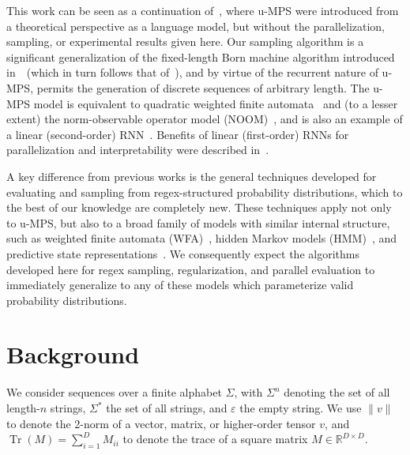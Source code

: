 \documentclass[twoside]{article}
\DeclareMathOperator{\Tr}{Tr}
\newcommand{\R}{\mathbb{R}}
\newcommand{\field}[1]{\R^{#1}}
\begin{document}
This work can be seen as a continuation of~\citep{pestun2017a}, where u-MPS were introduced from a theoretical perspective as a language model, but without the parallelization, sampling, or experimental results given here. Our sampling algorithm is a significant generalization of the fixed-length Born machine algorithm introduced in~\citep{han2018}~(which in turn follows that of~\citep{ferris2012}), and by virtue of the recurrent nature of u-MPS, permits the generation of discrete sequences of arbitrary length. The u-MPS model is equivalent to quadratic weighted finite automata~\citep{bailly2011} and (to a lesser extent) the norm-observable operator model (NOOM)~\citep{zhao2010}, and is also an example of a linear (second-order) RNN~\citep{rabusseau2019}. Benefits of linear (first-order) RNNs for parallelization and interpretability were described in~\citep{martin2018, foerster2017input}.

A key difference from previous works is the general techniques developed for evaluating and sampling from regex-structured probability distributions, which to the best of our knowledge are completely new. These techniques apply not only to u-MPS, but also to a broad family of models with similar internal structure, such as weighted finite automata (WFA)~\citep{droste2009}, hidden Markov models (HMM)~\citep{rabiner1986}, and predictive state representations~\citep{littman2002}. We consequently expect the algorithms developed here for regex sampling, regularization, and parallel evaluation to immediately generalize to any of these models which parameterize valid probability distributions.

\section{Background}

We consider sequences over a finite alphabet $\Sigma$, with $\Sigma^n$ denoting the set of all length-$n$ strings, $\Sigma^*$ the set of all strings, and $\varepsilon$ the empty string. We use $\lVert v\rVert$ to denote the 2-norm of a vector, matrix, or higher-order tensor $v$, and $\Tr(M)=\sum_{i=1}^D M_{ii}$ to denote the trace of a square matrix $M\in\field{D\times D}$.
\end{document}
